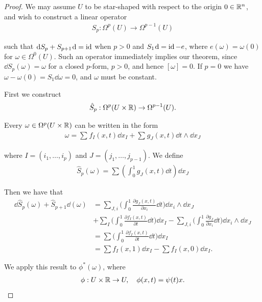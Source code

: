 \begin{proof}
  We may assume $U$ to be star-shaped with respect to the origin $0\in{\ensuremath{\mathbb{R}}}^n$,
and wish to construct a linear operator
\begin{align*}
  S_p: \Omega^p(U) \to \Omega^{p-1}(U)
\end{align*}

such that $\dd S_p + S_{p+1}\dd = \id$ when $p > 0$ and $S_1\dd = \id - e$, where $e(\omega) = \omega(0)$
for $\omega\in\Omega^0(U)$. Such an operator immediately implies our theorem, since
$\dd S_p(\omega) = \omega$ for a closed $p$-form, $p > 0$, and hence $[\omega] = 0$. If $p = 0$ we
have $\omega - \omega(0) = S_1\dd\omega = 0$, and $\omega$ must be constant.

First we construct
\begin{align*}
  \hat{S}_p:\Omega^p(U\times{\ensuremath{\mathbb{R}}})\to\Omega^{p-1}(U).
\end{align*}

Every $\omega\in\Omega^p(U\times{\ensuremath{\mathbb{R}}})$ can be written in the form
\begin{align*}
  \omega = \sum_{}^{}{f_I(x, t)\dd x_I} + \sum_{}^{}{g_J(x, t)\dd t\wedge\dd x_J}
\end{align*}

where $I= (i_1, \ldots, i_p)$ and $J = (j_1, \ldots, j_{p-1})$. We define
\begin{align*}
  \hat{S}_p(\omega) = \sum\left(\int_{0}^{1}g_J(x, t)\dd t\right)\dd x_J
\end{align*}

Then we have that 
\begin{align*}
    \dd\hat{S}_{p}(\omega)+\hat{S}_{p+1}\dd(\omega)
    & = \sum_{J,i}\biggl(\int_{0}^{1}\frac{\partial g_{J}(x,t)}{\partial x_{i}}\dd t\biggr)\dd x_{i}\wedge\dd x_{J} \\
    & + \sum_{I}\biggl(\int_{0}^{1}\frac{\partial f_{I}(x,t)}{\partial t}\dd t\biggr)\dd x_{I}
        - \sum_{J,i}\biggl(\int_{0}^{1}\frac{\partial g_{J}}{\partial x_{i}}\dd t\biggr)\dd x_{i}\wedge\dd x_{J} \\
    & = \sum\biggl(\int_{0}^{1}\frac{\partial f_{I}(x,t)}{\partial t}\dd t\biggr)\dd x_{I} \\
    & = \sum f_{I}(x,1)\dd x_{I}-\sum f_{I}(x,0)\dd x_{I}.
\end{align*}

We apply this result to $\phi^*(\omega)$, where 
\begin{align*}
  \phi:U \times {\ensuremath{\mathbb{R}}}\to U, \quad \phi(x, t) = \psi(t)x.
\end{align*}


\end{proof}
